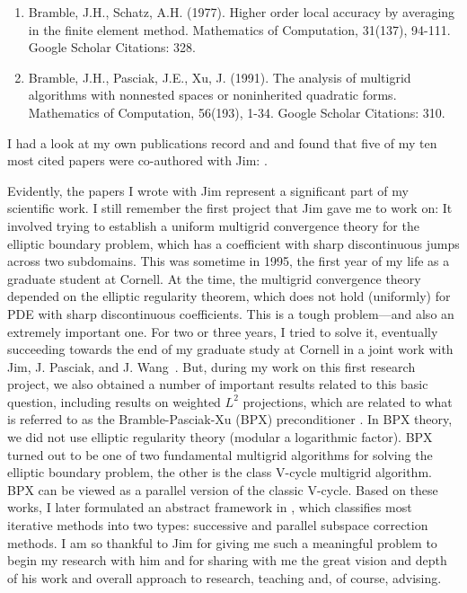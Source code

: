 \documentclass[CJK,11pt]{amsart}
\theoremstyle{definition}
\begin{document}
\begin{CJK*}{UTF8}{gbsn}
\begin{enumerate}
\item Bramble, J.H., Schatz, A.H. (1977). Higher order local accuracy by averaging in the finite element method. Mathematics of Computation, 31(137), 94-111. Google Scholar Citations: 328.
\item Bramble, J.H., Pasciak, J.E., Xu, J. (1991). The analysis of multigrid algorithms with nonnested spaces or noninherited quadratic forms. Mathematics of Computation, 56(193), 1-34. Google Scholar Citations: 310.
\end{enumerate}
I had a look at my own publications record and and found that five of my ten most cited papers were co-authored with Jim:
\cite{xu1992iterative,bramble1990parallel,xu1996two,xu1994novel,bramble1991convergencea,bramble1991convergenceb,bramble1991some,hiptmair2007nodal,bramble1991analysis,xu1998some}. 

Evidently, the papers I wrote with Jim represent a significant part of my scientific work. I still remember the first project that Jim gave me to work on: It involved trying to establish a uniform multigrid convergence theory for the elliptic boundary problem, which has a coefficient with sharp discontinuous jumps across two subdomains. This was sometime in 1995, the first year of my life as a graduate student at Cornell. At the time, the multigrid convergence theory depended on the elliptic regularity theorem, which does not hold (uniformly) for PDE with sharp discontinuous coefficients. This is a tough problem—and also an extremely important one. For two or three years, I tried to solve it, eventually succeeding towards the end of my graduate study at Cornell in a joint work with Jim, J. Pasciak, and J. Wang~\cite{bramble1991convergence-a}. But, during my work on this first research project, we also obtained a number of important results related to this basic question, including results on weighted $L^2$ projections, which are related to what is referred to as the Bramble-Pasciak-Xu (BPX) preconditioner \cite{bramble1990parallel}. In BPX theory, we did not use elliptic regularity theory (modular a logarithmic factor). BPX turned out to be one of two fundamental multigrid algorithms for solving the elliptic boundary problem, the other is the class V-cycle multigrid algorithm. BPX can be viewed as a parallel version of the classic V-cycle. Based on these works, I later formulated an abstract framework in \cite{xu1992iterative}, which classifies most iterative methods into two types: successive and parallel subspace correction methods. I am so thankful to Jim for giving me such a meaningful problem to begin my research with him and for sharing with me the great vision and depth of his work and overall approach to research, teaching and, of course, advising. 

\end{CJK*}
\end{document}
